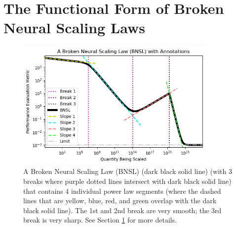 \documentclass{article} %
\begin{document}
%
\vspace{-2.6mm}
\section{The Functional Form of Broken Neural Scaling Laws}
\label{section:bnsl}
\vspace{-4.7mm}

\begin{figure}[h]%
    \centering


\hspace*{-.04cm}\includegraphics[width=0.87\textwidth]{figures/figure_1/figure_1__wide.png}
\vspace{-4.7mm}

    \caption{A Broken Neural Scaling Law (BNSL) (dark black solid line) (with 3 breaks where purple dotted lines intersect with dark black solid line) that contains 4 individual power law segments (where the dashed lines that are yellow, blue, red, and green overlap with the dark black solid line). The 1st and 2nd break are very smooth; the 3rd break is very sharp. See Section \ref{section:bnsl} for more details.}
    \label{fig:figure_1}
\end{figure}
\end{document}

